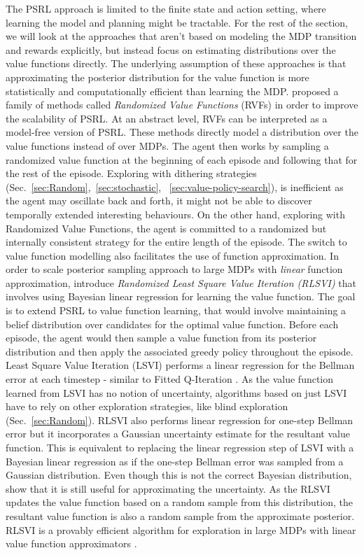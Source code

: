 The PSRL approach is limited to the finite state and action setting, where learning the model and planning might be tractable. For the rest of the section, we will look at the approaches that aren't based on modeling the MDP transition and rewards explicitly, but instead focus on estimating distributions over the value functions directly. The underlying assumption of these approaches is that approximating the posterior distribution for the value function is more statistically and computationally efficient than learning the MDP.  proposed a family of methods called \textit{Randomized Value Functions} (RVFs) in order to improve the scalability of PSRL. At an abstract level, RVFs can be interpreted as a model-free version of PSRL. These methods directly model a distribution over the value functions instead of over MDPs. The agent then works by sampling a randomized value function at the beginning of each episode and following that for the rest of the episode.  Exploring with dithering strategies (Sec.~\ref{sec:Random},~\ref{sec:stochastic},~ \ref{sec:value-policy-search}), is inefficient as the agent may oscillate back and forth, it might not be able to discover temporally extended interesting behaviours. On the other hand, exploring with Randomized Value Functions, the agent is committed to a randomized but internally consistent strategy for the entire length of the episode. The switch to value function modelling also facilitates the use of function approximation. 
In order to scale posterior sampling approach to large MDPs with \textit{linear} function approximation,   introduce \textit{Randomized Least Square Value Iteration (RLSVI)} that involves using Bayesian linear regression for learning the value function. 
The goal is to extend PSRL to value function learning, that would involve maintaining a belief distribution over candidates for the optimal value function. Before each episode, the agent would then sample a value function from its posterior distribution and then apply the associated greedy policy throughout the episode. 
Least Square Value Iteration (LSVI)  performs a linear regression for the Bellman error at each timestep - similar to Fitted Q-Iteration  . As the value function learned from LSVI has no notion of uncertainty, algorithms based on just LSVI have to rely on other exploration strategies, like blind exploration (Sec.~\ref{sec:Random}). 
RLSVI also performs linear regression for one-step Bellman error but it incorporates a Gaussian uncertainty estimate for the resultant value function. This is equivalent to replacing the linear regression step of LSVI with a Bayesian linear regression as if the one-step Bellman error was sampled from a Gaussian distribution. Even though this is not the correct Bayesian distribution,  show that it is still useful for approximating the uncertainty. As the RLSVI updates the value function based on a random sample from this distribution, the resultant value function is also a random sample from the approximate posterior. RLSVI is a provably efficient algorithm for exploration in large MDPs with linear value function approximators .
